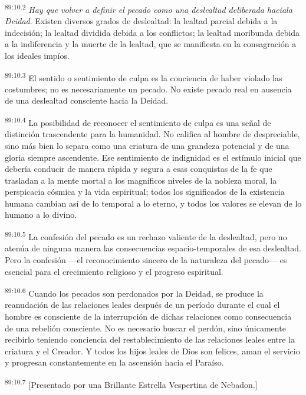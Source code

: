 \par
\textsuperscript{89:10.2} \textit{Hay que volver a definir el pecado como una deslealtad deliberada haciala Deidad}. Existen diversos grados de deslealtad: la lealtad parcial debida a la indecisión; la lealtad dividida debida a los conflictos; la lealtad moribunda debida a la indiferencia y la muerte de la lealtad, que se manifiesta en la consagración a los ideales impíos.

\par
\textsuperscript{89:10.3} El sentido o sentimiento de culpa es la conciencia de haber violado las costumbres; no es necesariamente un pecado. No existe pecado real en ausencia de una deslealtad consciente hacia la Deidad.

\par
\textsuperscript{89:10.4} La posibilidad de reconocer el sentimiento de culpa es una señal de distinción trascendente para la humanidad. No califica al hombre de despreciable, sino más bien lo separa como una criatura de una grandeza potencial y de una gloria siempre ascendente. Ese sentimiento de indignidad es el estímulo inicial que debería conducir de manera rápida y segura a esas conquistas de la fe que trasladan a la mente mortal a los magníficos niveles de la nobleza moral, la perspicacia cósmica y la vida espiritual; todos los significados de la existencia humana cambian así de lo temporal a lo eterno, y todos los valores se elevan de lo humano a lo divino.

\par
\textsuperscript{89:10.5} La confesión del pecado es un rechazo valiente de la deslealtad, pero no atenúa de ninguna manera las consecuencias espacio-temporales de esa deslealtad. Pero la confesión ---el reconocimiento sincero de la naturaleza del pecado--- es esencial para el crecimiento religioso y el progreso espiritual.

\par
\textsuperscript{89:10.6} Cuando los pecados son perdonados por la Deidad, se produce la reanudación de las relaciones leales después de un período durante el cual el hombre es consciente de la interrupción de dichas relaciones como consecuencia de una rebelión consciente. No es necesario buscar el perdón, sino únicamente recibirlo teniendo conciencia del restablecimiento de las relaciones leales entre la criatura y el Creador. Y todos los hijos leales de Dios son felices, aman el servicio y progresan constantemente en la ascensión hacia el Paraíso.

\par
\textsuperscript{89:10.7} [Presentado por una Brillante Estrella Vespertina de Nebadon.]